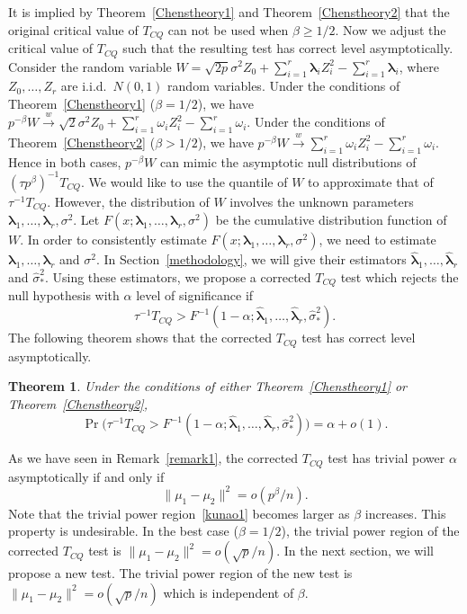 \documentclass[3p]{elsarticle}
\newcommand{\bfsym}[1]{\ensuremath{\boldsymbol{#1}}}
\def\blambda {\bfsym {\lambda}}        \def\bLambda {\bfsym {\Lambda}}
\theoremstyle{plain}
\newtheorem{theorem}{\quad\quad Theorem}
\theoremstyle{definition}
\theoremstyle{remark}
\begin{document}
It is implied by Theorem~\ref{Chenstheory1} and Theorem~\ref{Chenstheory2} that the original critical value of $T_{CQ}$ can not be used when $\beta\geq 1/2$.
Now we adjust the critical value of $T_{CQ}$ such that the resulting test has correct level asymptotically.
Consider the random variable
$
W=
\sqrt{2p}\sigma^2 Z_0
+
        \sum_{i=1}^r \blambda_i Z_i^2
            -
        \sum_{i=1}^r \blambda_i
        $, 
where $Z_0,\ldots,Z_r$ are i.i.d.\ $N(0,1)$ random variables.
Under the conditions of Theorem~\ref{Chenstheory1} ($\beta=1/2$), we have
$
  p^{-\beta}W\xrightarrow{w}
\sqrt{2}\sigma^2 Z_0 + \sum_{i=1}^r \omega_i Z_i^2 -\sum_{i=1}^r \omega_i
$.
Under the conditions of Theorem~\ref{Chenstheory2} ($\beta>1/2$), we have
$
 p^{-\beta}W\xrightarrow{w}
\sum_{i=1}^r \omega_i Z_i^2 -\sum_{i=1}^r \omega_i.
$
Hence in both cases, $p^{-\beta}W$ can mimic the asymptotic null distributions of $(\tau p^{\beta})^{-1}T_{CQ}$.
We would like to use the quantile of $W$ to approximate that of $\tau^{-1}T_{CQ}$.
        However, the distribution of $W$ involves the unknown parameters $\blambda_1,\ldots,\blambda_r,\sigma^2$.
Let $F(x;\blambda_1,\ldots,\blambda_r,\sigma^2)$ be the cumulative distribution function of $W$.
In order to consistently estimate $F(x;\blambda_1,\ldots,\blambda_r,\sigma^2)$, we need to estimate $\blambda_1,\ldots,\blambda_r$ and $\sigma^2$.
In Section~\ref{methodology}, we will give their estimators $\hat{\blambda}_1,\ldots,\hat{\blambda}_r$ and $\hat{\sigma}_{*}^2$. 
Using these estimators, we propose a corrected $T_{CQ}$ test which rejects the null hypothesis with $\alpha$ level of significance if
$$
\tau^{-1}{T_{CQ}}> F^{-1}(1-\alpha;\hat{\blambda}_1,\ldots,\hat{\blambda}_r,\hat{\sigma}_*^2).
$$
The following theorem shows that the corrected $T_{CQ}$ test has correct level asymptotically.

\begin{theorem}\label{theoremRev}
Under the conditions of either Theorem~\ref{Chenstheory1} or Theorem~\ref{Chenstheory2},
$$
    \Pr\big(\tau^{-1}{T_{CQ}}> F^{-1}(1-\alpha;\hat{\blambda}_1,\ldots,\hat{\blambda}_r,\hat{\sigma}_*^2)\big)=\alpha+o(1).
$$
\end{theorem}





As we have seen in Remark~\ref{remark1}, the corrected $T_{CQ}$ test has trivial power $\alpha$ asymptotically if and only if
\begin{equation}\label{kunao1}
\|\mu_1-\mu_2\|^2 = o( p^{\beta}/n).
\end{equation}
Note that the trivial power region~\eqref{kunao1} becomes larger as $\beta$ increases.
This property is undesirable.
In the best case ($\beta=1/2$), the trivial power region of the corrected $T_{CQ}$ test is $\|\mu_1-\mu_2\|^2=o(\sqrt{p}/n)$.
In the next section, we will propose a new test. The trivial power region of the new test is $\|\mu_1-\mu_2\|^2=o(\sqrt{p}/n)$ which is independent of $\beta$.
\end{document}
